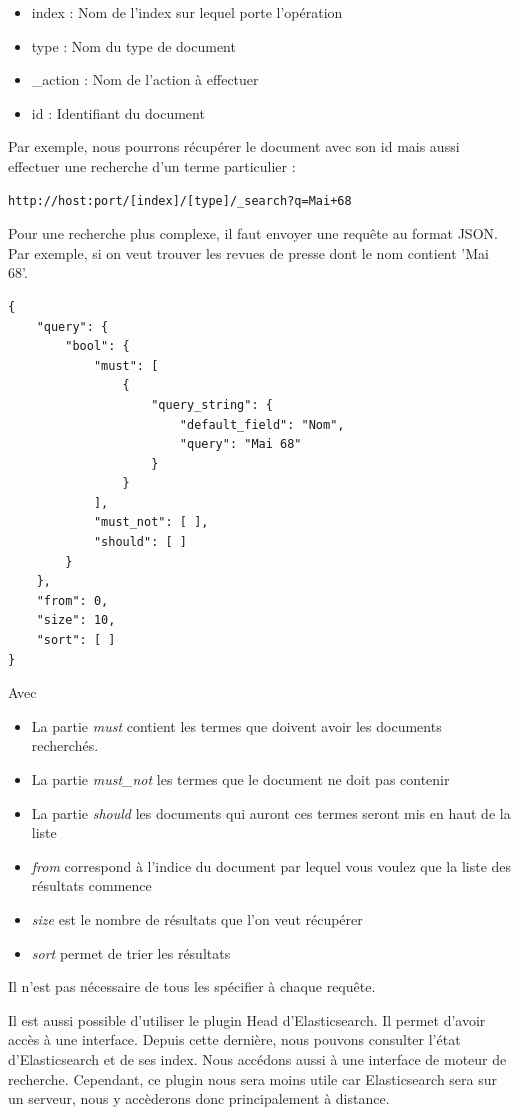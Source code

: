 \begin{itemize}
	\item index : Nom de l’index sur lequel porte l’opération
	\item type : Nom du type de document
	\item \_action : Nom de l’action à effectuer
	\item id : Identifiant du document
\end{itemize}


Par exemple, nous pourrons récupérer le document avec son id mais aussi effectuer une recherche d’un terme particulier :
\begin{verbatim}
http://host:port/[index]/[type]/_search?q=Mai+68
\end{verbatim}

Pour une recherche plus complexe, il faut envoyer une requête au format JSON. Par exemple, si on veut trouver les revues de presse dont le nom contient 'Mai 68'.

\begin{verbatim}
{
    "query": {
        "bool": {
            "must": [
                {
                    "query_string": {
                        "default_field": "Nom",
                        "query": "Mai 68"
                    }
                }
            ],
            "must_not": [ ],
            "should": [ ]
        }
    },
    "from": 0,
    "size": 10,
    "sort": [ ]
}
\end{verbatim}

Avec
\begin{itemize}
	\item La partie \textit{must} contient les termes que doivent avoir les documents recherchés.
	\item La partie \textit{must\_not} les termes que le document ne doit pas contenir
	\item La partie \textit{should} les documents qui auront ces termes seront mis en haut de la liste
	\item \textit{from} correspond à l'indice du document par lequel vous voulez que la liste des résultats commence
	\item \textit {size} est le nombre de résultats que l'on veut récupérer
	\item \textit{sort} permet de trier les résultats
\end{itemize}
Il n'est pas nécessaire de tous les spécifier à chaque requête.


Il est aussi possible d’utiliser le plugin Head d’Elasticsearch. Il permet d’avoir accès à une interface. Depuis cette dernière, nous pouvons consulter l’état d’Elasticsearch et de ses index. Nous accédons aussi à une interface de moteur de recherche. Cependant, ce plugin nous sera moins utile car Elasticsearch sera sur un serveur, nous y accèderons donc principalement à distance.

